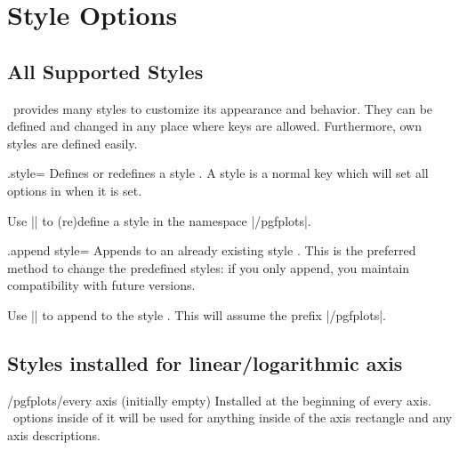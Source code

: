 
\section{Style Options}
\label{sec:styles}
\subsection{All Supported Styles}
\PGFPlots\ provides many styles to customize its appearance and behavior. They can be defined and changed in any place where keys are allowed. Furthermore, own styles are defined easily.

\begin{handler}{{.style}=}
	Defines or redefines a style . A style is a normal key which will set all options in  when it is set.

	Use	|| to (re)define a style  in the namespace |/pgfplots|.
\end{handler}

\begin{handler}{{.append style}=}
	Appends  to an already existing style . This is the preferred method to change the predefined styles: if you only append, you maintain compatibility with future versions.

	Use	|| to append  to the style . This will assume the prefix |/pgfplots|.
\end{handler}

\subsection*{Styles installed for linear/logarithmic axis}

\begin{stylekey}{/pgfplots/every axis (initially empty)}
 Installed at the beginning of every axis. \Tikz\ options inside of it will be used for anything inside of the axis rectangle and any axis descriptions.
\end{stylekey}

